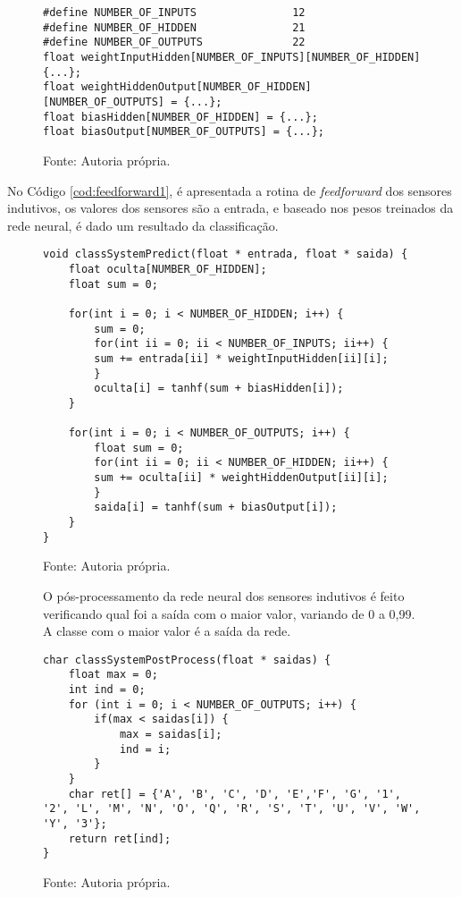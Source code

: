 \begin{figure}[H]
	\begin{lstlisting}[breaklines, frame=single, caption=Definições da rede neural dos sensores indutivos, style=CStyle, label=cod:defines1]
#define NUMBER_OF_INPUTS               12
#define NUMBER_OF_HIDDEN               21
#define NUMBER_OF_OUTPUTS              22
float weightInputHidden[NUMBER_OF_INPUTS][NUMBER_OF_HIDDEN] {...};
float weightHiddenOutput[NUMBER_OF_HIDDEN][NUMBER_OF_OUTPUTS] = {...};
float biasHidden[NUMBER_OF_HIDDEN] = {...};
float biasOutput[NUMBER_OF_OUTPUTS] = {...};
	\end{lstlisting}
	\caption*{Fonte: Autoria própria.}
\end{figure}
	
	No Código \ref{cod:feedforward1}, é apresentada a rotina de \textit{feedforward} dos sensores indutivos, os valores dos sensores são a entrada, e baseado nos pesos treinados da rede neural, é dado um resultado da classificação.
	
\begin{figure}[H]
\begin{lstlisting}[breaklines, frame=single, caption=\textit{Feedforward implementado no microcontrolador}, style=CStyle, label=cod:feedforward1]
void classSystemPredict(float * entrada, float * saida) {
	float oculta[NUMBER_OF_HIDDEN];
	float sum = 0;
	
	for(int i = 0; i < NUMBER_OF_HIDDEN; i++) {
		sum = 0;
		for(int ii = 0; ii < NUMBER_OF_INPUTS; ii++) {
		sum += entrada[ii] * weightInputHidden[ii][i];
		}
		oculta[i] = tanhf(sum + biasHidden[i]);
	}
	
	for(int i = 0; i < NUMBER_OF_OUTPUTS; i++) {
		float sum = 0;
		for(int ii = 0; ii < NUMBER_OF_HIDDEN; ii++) {
		sum += oculta[ii] * weightHiddenOutput[ii][i];
		}
		saida[i] = tanhf(sum + biasOutput[i]);
	}
}
\end{lstlisting}
\caption*{Fonte: Autoria própria.}
\end{figure}
	
	\begin{figure}[H]
	
	O pós-processamento da rede neural dos sensores indutivos é feito verificando qual foi a saída com o maior valor, variando de 0 a 0,99. A classe com o maior valor é a saída da rede. 
\begin{lstlisting}[breaklines, frame=single, caption=Pós processamento da rede neural dos sensores indutivos, style=CStyle, label=cod:pos1]
char classSystemPostProcess(float * saidas) {
	float max = 0;
	int ind = 0;
	for (int i = 0; i < NUMBER_OF_OUTPUTS; i++) {
		if(max < saidas[i]) {
			max = saidas[i];
			ind = i;
		}
	}
	char ret[] = {'A', 'B', 'C', 'D', 'E','F', 'G', '1', '2', 'L', 'M', 'N', 'O', 'Q', 'R', 'S', 'T', 'U', 'V', 'W', 'Y', '3'};
	return ret[ind];
}
\end{lstlisting}
\caption*{Fonte: Autoria própria.}
\end{figure}

